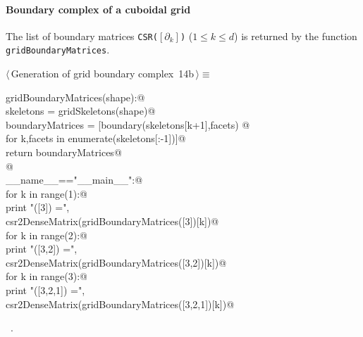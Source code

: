 \documentclass[11pt,oneside]{article}	%
\begin{document}
\paragraph{Boundary complex of a cuboidal grid}
The list of boundary matrices \texttt{CSR($[\partial_k]$)} ($1\leq k\leq d$) is returned by the function
\texttt{gridBoundaryMatrices}.

\begin{flushleft} \small \label{scrap19}
\protect{}$\langle\,$Generation of grid boundary complex\nobreak\ {\footnotesize 14b}$\,\rangle\equiv$
\vspace{-1ex}
\begin{list}{}{} \item
\mbox{}\verb@def gridBoundaryMatrices(shape):@\\
\mbox{}\verb@   skeletons = gridSkeletons(shape)@\\
\mbox{}\verb@   boundaryMatrices = [boundary(skeletons[k+1],facets) @\\
\mbox{}\verb@                   for k,facets in enumerate(skeletons[:-1])]@\\
\mbox{}\verb@   return boundaryMatrices@\\
\mbox{}\verb@   @\\
\mbox{}\verb@if __name__=="__main__":@\\
\mbox{}\verb@   for k in range(1):@\\
\mbox{}\verb@      print "\ngridBoundaryMatrices([3]) =\n", \@\\
\mbox{}\verb@            csr2DenseMatrix(gridBoundaryMatrices([3])[k])@\\
\mbox{}\verb@   for k in range(2):@\\
\mbox{}\verb@      print "\ngridBoundaryMatrices([3,2]) =\n", \@\\
\mbox{}\verb@            csr2DenseMatrix(gridBoundaryMatrices([3,2])[k])@\\
\mbox{}\verb@   for k in range(3):@\\
\mbox{}\verb@      print "\ngridBoundaryMatrices([3,2,1]) =\n", \@\\
\mbox{}\verb@            csr2DenseMatrix(gridBoundaryMatrices([3,2,1])[k])@\\
\mbox{}\verb@@{\NWsep}
\end{list}
\vspace{-1ex}
\footnotesize\addtolength{\baselineskip}{-1ex}
\begin{list}{}{\setlength{\itemsep}{-\parsep}\setlength{\itemindent}{-\leftmargin}}
\item \NWtxtMacroRefIn\ .
\end{list}
\end{flushleft}
\end{document}

